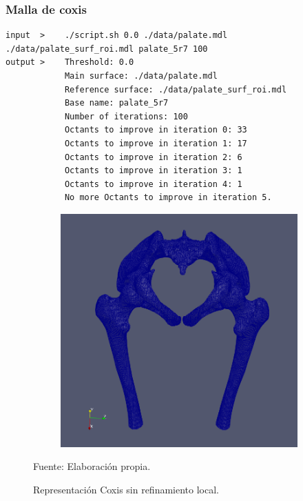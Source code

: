\subsubsection{Malla de coxis}


\begin{lstlisting}[style=Console,caption={Output de ejecución algoritmo propuesto en malla de Moai con zona a refinar en zona superior.\\ Fuente: Elaboración propia.},label={out:moai_2}, float,floatplacement=H]
input  >    ./script.sh 0.0 ./data/palate.mdl ./data/palate_surf_roi.mdl palate_5r7 100
output >    Threshold: 0.0
            Main surface: ./data/palate.mdl
            Reference surface: ./data/palate_surf_roi.mdl
            Base name: palate_5r7
            Number of iterations: 100
            Octants to improve in iteration 0: 33
            Octants to improve in iteration 1: 17
            Octants to improve in iteration 2: 6
            Octants to improve in iteration 3: 1
            Octants to improve in iteration 4: 1
            No more Octants to improve in iteration 5.
\end{lstlisting}




\begin{figure}[!ht]
    \centering
    \begin{subfigure}[t]{0.8\textwidth}
        \includegraphics[width=1.0\textwidth]{figures/meshes/coxis_8r9_01.png}
    \end{subfigure}
    \caption{ Representación Coxis sin refinamiento local. }
    Fuente: Elaboración propia.
    \label{fig:coxis_8r9_all}
\end{figure}



